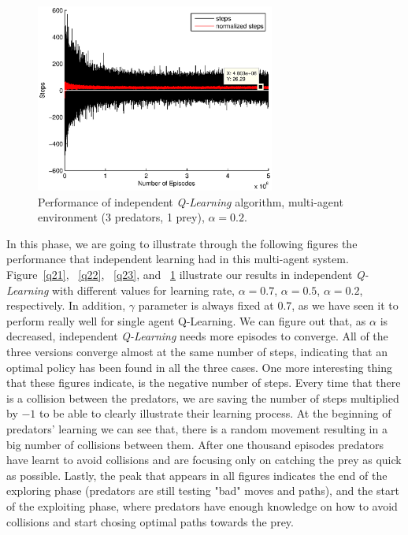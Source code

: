 \documentclass[a4paper,11pt]{article}
\begin{document}
~
\begin{figure}[ht!]
  \centering
	\includegraphics[width=0.7\textwidth]{figures/iq3.eps}
    \caption{Performance of independent \textit{Q-Learning} algorithm, multi-agent environment (3 predators, 1 prey), $\alpha = 0.2$.}
    \label{q33}
\end{figure}

In this phase, we are going to illustrate through the following figures the performance that independent learning had in this multi-agent system. 
Figure~\ref{q21}, ~\ref{q22}, ~\ref{q23}, and ~\ref{q33} illustrate our results in independent \textit{Q-Learning} with different values for learning rate, $\alpha = 0.7$, $\alpha = 0.5$, $\alpha = 0.2$, respectively. In addition, $\gamma$ parameter is always fixed at $0.7$, as we have seen it to perform really well for single agent {Q-Learning}. We can figure out that, as $\alpha$ is decreased, independent \textit{Q-Learning} needs more episodes to converge. All of the three versions converge almost at the same number of steps, indicating that an optimal policy has been found in all the three cases.   
One more interesting thing that these figures indicate, is the negative number of steps. Every time that there is a collision between the predators, we are saving the number of steps multiplied by $-1$ to be able to clearly illustrate their learning process. At the beginning of predators' learning we can see that, there is a random movement resulting in a big number of collisions between them. After one thousand episodes predators have learnt to avoid collisions and are focusing only on catching the prey as quick as possible. Lastly, the peak that appears in all figures indicates the end of the exploring phase (predators are still testing "bad" moves and paths), and the start of the exploiting phase, where predators have enough knowledge on how to avoid collisions and start chosing optimal paths towards the prey.
\end{document}
